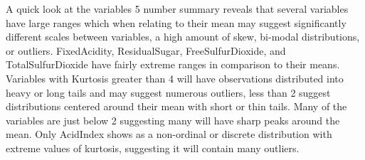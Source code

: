 \documentclass[
]{article}
\begin{document}
\newline

A quick look at the variables 5 number summary reveals that several
variables have large ranges which when relating to their mean may
suggest significantly different scales between variables, a high amount
of skew, bi-modal distributions, or outliers. FixedAcidity,
ResidualSugar, FreeSulfurDioxide, and TotalSulfurDioxide have fairly
extreme ranges in comparison to their means. Variables with Kurtosis
greater than 4 will have observations distributed into heavy or long
tails and may suggest numerous outliers, less than 2 suggest
distributions centered around their mean with short or thin tails. Many
of the variables are just below 2 suggesting many will have sharp peaks
around the mean. Only AcidIndex shows as a non-ordinal or discrete
distribution with extreme values of kurtosis, suggesting it will contain
many outliers.
\end{document}
